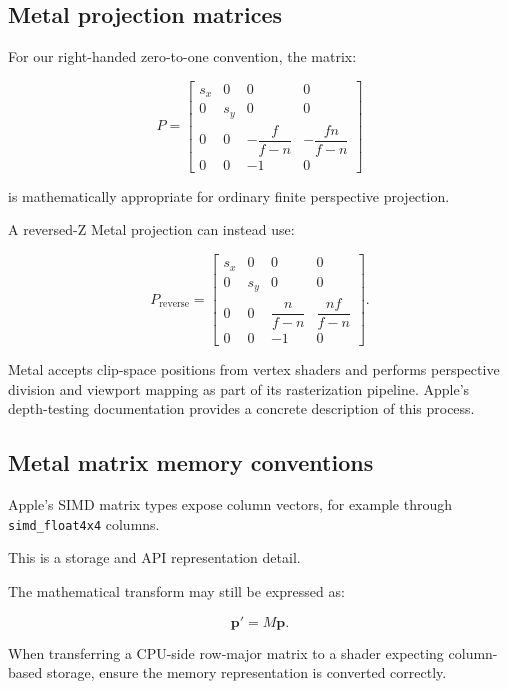 \subsection{Metal projection matrices}\label{02-foundations-ii-ch033-metal-projection-matrices}

\hypertarget{02-foundations-ii-ch033-metal-projection-matrices}{}

For our right-handed zero-to-one convention, the matrix:

\[
 P= \begin{bmatrix} s_x&0&0&0\\ 0&s_y&0&0\\ 0&0&-\dfrac f{f-n}&-\dfrac{fn}{f-n}\\ 0&0&-1&0 \end{bmatrix}
\]

is mathematically appropriate for ordinary finite perspective projection.

A reversed-Z Metal projection can instead use:

\[
 P_{\mathrm{reverse}}= \begin{bmatrix} s_x&0&0&0\\ 0&s_y&0&0\\ 0&0&\dfrac n{f-n}&\dfrac{nf}{f-n}\\ 0&0&-1&0 \end{bmatrix}.
\]

Metal accepts clip-space positions from vertex shaders and performs perspective division and viewport mapping as part of its rasterization pipeline. Apple's depth-testing documentation provides a concrete description of this process. 

\subsection{Metal matrix memory conventions}\label{02-foundations-ii-ch033-metal-matrix-memory-conventions}

\hypertarget{02-foundations-ii-ch033-metal-matrix-memory-conventions}{}

Apple's SIMD matrix types expose column vectors, for example through \texttt{simd\_float4x4} columns.

This is a storage and API representation detail.

The mathematical transform may still be expressed as:

\[
 \mathbf p'=M\mathbf p.
\]

When transferring a CPU-side row-major matrix to a shader expecting column-based storage, ensure the memory representation is converted correctly.

